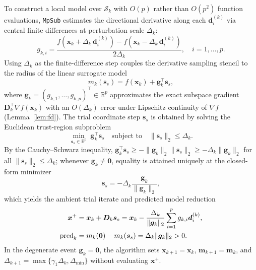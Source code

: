 \documentclass[smallextended]{svjour3}
\newcommand{\bx}{\bm{x}}
\newcommand{\bd}{\bm{d}}
\newcommand{\bg}{\bm{g}}
\newcommand{\bs}{\bm{s}}
\begin{document}
To construct a local model over $\mathcal{S}_k$ with $O(p)$ rather than $O(p^2)$ function evaluations, \texttt{MpSub} estimates the directional derivative along each $\bd_i^{(k)}$ via central finite differences at perturbation scale $\Delta_k$:
\begin{equation}
g_{k,i} = \frac{f(\bx_k + \Delta_k \, \bd_i^{(k)}) - f(\bx_k - \Delta_k \, \bd_i^{(k)})}{2\Delta_k}, \quad i = 1, \ldots, p.
\label{eq:central_diff}
\end{equation}
Using $\Delta_k$ as the finite-difference step couples the derivative sampling stencil to the radius of the linear surrogate model
\begin{equation}
m_k(\bs_s) = f(\bx_k) + \bg_k^\top \bs_s,
\label{eq:linear_model}
\end{equation}
where $\bg_k = (g_{k,1}, \ldots, g_{k,p})^\top \in \mathbb{R}^p$ approximates the exact subspace gradient $\bm D_k^\top \nabla f(\bx_k)$ with an $O(\Delta_k)$ error under Lipschitz continuity of $\nabla f$ (Lemma~\ref{lem:fd}). The trial coordinate step $\bs_s$ is obtained by solving the Euclidean trust-region subproblem
\[
\min_{\bs_s \in \mathbb{R}^p}\; \bg_k^\top \bs_s \quad \text{subject to} \quad \|\bs_s\|_2 \leq \Delta_k.
\]
By the Cauchy--Schwarz inequality, $\bg_k^\top \bs_s \ge -\|\bg_k\|_2 \|\bs_s\|_2 \ge -\Delta_k \|\bg_k\|_2$ for all $\|\bs_s\|_2 \le \Delta_k$; whenever $\bg_k \ne \bm 0$, equality is attained uniquely at the closed-form minimizer
\begin{equation}
\bs_s = -\Delta_k \frac{\bg_k}{\|\bg_k\|_2},
\label{eq:closed_form_step}
\end{equation}
which yields the ambient trial iterate and predicted model reduction
\begin{align}
\bx^+ &= \bx_k + \bm D_k \bs_s = \bx_k - \frac{\Delta_k}{\|\bg_k\|_2} \sum_{i=1}^p g_{k,i} \bd_i^{(k)}, \label{eq:full_trial_point} \\
\operatorname{pred}_k &= m_k(\bm 0) - m_k(\bs_s) = \Delta_k \|\bg_k\|_2 > 0. \notag
\end{align}
In the degenerate event $\bg_k = \bm 0$, the algorithm sets $\bx_{k+1} = \bx_k$, $\bm m_{k+1} = \bm m_k$, and $\Delta_{k+1} = \max\{\gamma_1 \Delta_k, \Delta_{\min}\}$ without evaluating $\bx^+$.
\end{document}
